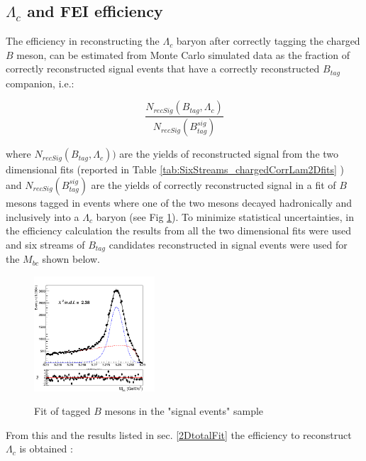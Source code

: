 \subsection{$\Lambda_c$ and FEI efficiency}

The efficiency in reconstructing the ${\Lambda_c}$ baryon after correctly tagging the charged $B$ meson, can be estimated from Monte Carlo simulated data as the fraction of correctly reconstructed signal events that have a correctly reconstructed $B_{tag}$ companion, i.e.: 

\begin{equation}
    \frac{N_{recSig}(B_{tag}, \Lambda_c)}{N_{recSig}(B_{tag}^{sig})}
\end{equation}

\vspace{0.5cm}

\noindent where $N_{recSig}(B_{tag}, \Lambda_c))$ are the yields of reconstructed signal from the two dimensional fits (reported in Table \ref{tab:SixStreams_chargedCorrLam2Dfits} ) and  $N_{recSig}(B_{tag}^{sig})$ are the yields of correctly reconstructed signal in a fit of $B$ mesons tagged in events where one of the two mesons decayed hadronically and inclusively into a ${\Lambda_c}$ baryon (see Fig \ref{fig:sixstreams_chargedBtagSignal_fit}). 
To minimize statistical uncertainties, in the efficiency calculation the results from all the two dimensional fits were used and six streams of $B_{tag}$ candidates reconstructed in signal events were used for the $M_{bc}$ shown below.

\begin{figure}[h!]
{\includegraphics[width=0.40\textwidth]{04-chargedCorrBtoLambda/figs/chargedBtag_corrLambdaC_TotalSignalBtag_fit.png}}
\caption{Fit of tagged $B$ mesons in the "signal events" sample}
\label{fig:sixstreams_chargedBtagSignal_fit}
\end{figure}


\vspace{0.5 cm}
From this and the results listed in sec. \ref{2DtotalFit} 
the efficiency to reconstruct ${\Lambda_c}$ is obtained : \\

